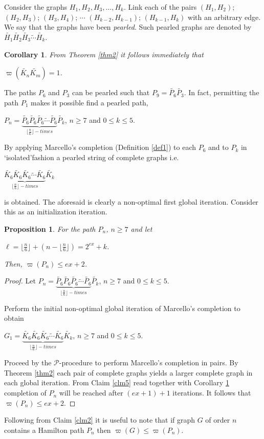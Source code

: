\documentclass[12pt]{amsart}
\numberwithin{equation}{section}
\newtheorem{proposition}[theorem]{Proposition}
\newtheorem{corollary}[theorem]{Corollary}
\numberwithin{equation}{section}
\begin{document}
Consider the graphs $H_1,H_2,H_3,\dots,H_k$. Link each of the pairs $(H_1,H_2)$; $(H_2,H_3)$; $(H_3,H_4)$; $\cdots$ $(H_{k-2},H_{k-1})$; $(H_{k-1},H_k)$ with an arbitrary edge. We say that the graphs have been \emph{pearled}. Such pearled graphs are denoted by $\tilde{H_1}\tilde{H_2}\tilde{H_3}\tilde{\cdots}\tilde{H_k}$.
\begin{corollary}\label{cor4}
From Theorem \ref{thm2} it follows immediately that
\begin{center}
$\varpi(\tilde{K_n}\tilde{K_m}) = 1$.
\end{center}
\end{corollary}
The paths $P_6$ and $P_3$ can be pearled such that $P_9 = \tilde{P_6}\tilde{P_3}$. In fact, permitting the path $P_1$ makes it possible find a pearled path,
\begin{center}
$P_n = \underbrace{\tilde{P_6}\tilde{P_6}\tilde{P_6}\tilde{\cdots}\tilde{P_6}}_{\lfloor \frac{n}{6}\rfloor-times}\tilde{P_k}$, $n \geq 7$ and $0 \leq k \leq 5$.
\end{center}
By applying Marcello's completion (Definition \ref{def1}) to each $P_6$ and to $P_k$ in \lq isolated\rq  fashion a pearled string of complete graphs i.e.
\begin{center}
$\underbrace{\tilde{K_6}\tilde{K_6}\tilde{K_6}\tilde{\cdots}\tilde{K_6}}_{\lfloor \frac{n}{6}\rfloor-times}\tilde{K_k}$
\end{center}
is obtained. The aforesaid is clearly a non-optimal first global iteration. Consider this as an initialization iteration. 
\begin{proposition}\label{prop4}
For the path $P_n$, $n \geq 7$ and let
\begin{center}
$\ell = \lfloor \frac{n}{6}\rfloor + (n - \lfloor \frac{n}{6}\rfloor) = 2^{ex} + k$.
\end{center}
Then, $\varpi(P_n) \leq ex + 2$.
\end{proposition}
\begin{proof}
Let $P_n = \underbrace{\tilde{P_6}\tilde{P_6}\tilde{P_6}\tilde{\cdots}\tilde{P_6}}_{\lfloor \frac{n}{6}\rfloor-times}\tilde{P_k}$, $n \geq 7$ and $0 \leq k \leq 5$.

Perform the initial non-optimal global iteration of Marcello's completion to obtain
\begin{center}
$G_1 = \underbrace{\tilde{K_6}\tilde{K_6}\tilde{K_6}\tilde{\cdots}\tilde{K_6}}_{\lfloor \frac{n}{6}\rfloor-times}\tilde{K_k}$, $n \geq 7$ and $0 \leq k \leq 5$.
\end{center}
Proceed by the $\mathcal{P}$-procedure to perform Marcello's completion in pairs. By Theorem \ref{thm2} each pair of complete graphs yields a larger complete graph in each global iteration. From Claim \ref{clm5} read together with Corollary \ref{cor4} completion of $P_n$ will be reached after $(ex+1)+1$ iterations. It follows that $\varpi(P_n) \leq ex+2$.
\end{proof}
Following from Claim \ref{clm2} it is useful to note that if graph $G$ of order $n$ contains a Hamilton path $P_n$ then $\varpi(G) \leq \varpi(P_n)$.
\end{document}
